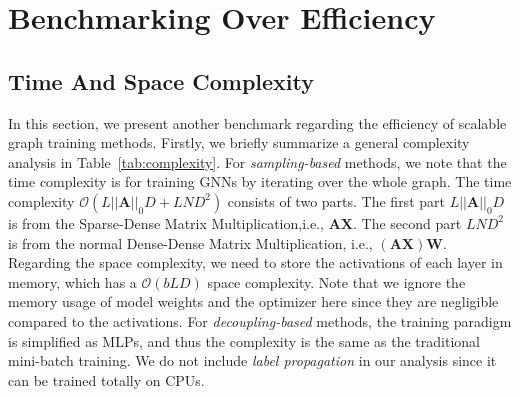 \message{ !name(main.tex)}\documentclass{article}
\newcommand{\bm}[1]{\mathbf{#1}}
\begin{document}
\vspace{-2mm}
\section{Benchmarking Over Efficiency}\label{sec:benchmarking_efficiency}
\vspace{-2mm}
\subsection{Time And Space Complexity}

In this section, we present another benchmark regarding the efficiency of scalable graph training methods. Firstly, we briefly summarize a general complexity analysis in Table~\ref{tab:complexity}. For \textit{sampling-based} methods, we note that the time complexity is for training GNNs by iterating over the whole graph. The time complexity  $\mathcal{O}(L||\bm{A}||_0 D + LND^2)$ consists of two parts. The first part $L||\bm{A}||_0 D$ is from the Sparse-Dense Matrix Multiplication,i.e., $\bm{A}\bm{X}$. The second part $LND^2$ is from the normal Dense-Dense Matrix Multiplication, i.e., $(\bm{A}\bm{X})\bm{W}$. Regarding the space complexity, we need to store the activations of each layer in memory, which has a $\mathcal{O}(bLD)$ space complexity. Note that we ignore the memory usage of model weights and the optimizer here since they are negligible compared to the activations. For \textit{decoupling-based} methods, the training paradigm is simplified as MLPs, and thus the complexity is the same as the traditional mini-batch training. We do not include \textit{label propagation} in our analysis since it can be trained totally on CPUs.
\end{document}
